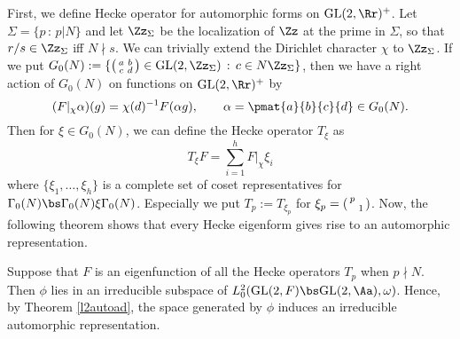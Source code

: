 First, we define Hecke operator for automorphic forms on $\GL(2, \Rr)^{+}$. 
Let $\Sigma = \{ p\,:\, p|N\}$ and let $\Zz_{\Sigma}$ be the localization of $\Zz$ at the prime in $\Sigma$, so that $r/s\in \Zz_{\Sigma}$ iff $N\nmid s$. 
We can trivially extend the Dirichlet character $\chi$ to $\Zz_{\Sigma}$. If we put $G_{0}(N) := \{\smat{a}{b}{c}{d}\in \GL(2, \Zz_{\Sigma})\,:\, c\in N\Zz_{\Sigma}\}$, then we have a right action of $G_{0}(N)$ on functions on $\GL(2, \Rr)^{+}$ by 
$$
(F|_{\chi}\alpha)(g) = \chi(d)^{-1}F(\alpha g), \qquad \alpha = \pmat{a}{b}{c}{d} \in G_{0}(N). 
$$
Then for $\xi \in G_{0}(N)$, we can define the Hecke operator $T_{\xi}$ as 
$$
T_{\xi}F = \sum_{i=1}^{h} F|_{\chi}\xi_i
$$
where $\{\xi_{1}, \dots, \xi_{h}\}$ is a complete set of coset representatives for $\Gamma_{0}(N) \bs \Gamma_{0}(N) \xi \Gamma_{0}(N)$. Especially we put $T_{p} := T_{\xi_p}$ for $\xi_{p} = \left(\begin{smallmatrix} p &  \\  & 1 \end{smallmatrix}\right)$.  
Now, the following theorem shows that every Hecke eigenform gives rise to an automorphic representation. 
\begin{theorem}
Suppose that $F$ is an eigenfunction of all the Hecke operators $T_{p}$ when $p\nmid N$. Then $\phi$ lies in an irreducible subspace of $L_{0}^{2}(\GL(2, F) \bs \GL(2, \Aa), \omega)$. Hence, by Theorem \ref{l2autoad}, the space generated by $\phi$ induces an irreducible automorphic representation. 
\end{theorem}
